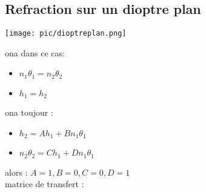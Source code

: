 \documentclass[12pt]{book}
\begin{document}
        \subsection{Refraction sur un dioptre plan}
            \begin{center}
                \texttt{[image: pic/dioptreplan.png]}
            \end{center}
            \begin{center}
                \begin{minipage}{0.49\linewidth}
                    ona dans ce cas:
                    \begin{itemize}
                        \item $n_1\theta_1 = n_2\theta_2$
                        \item $h_1 = h_2$
                    \end{itemize}
                    
                \end{minipage}
                \begin{minipage}{0.49\linewidth}
                    ona toujour :
                    \begin{itemize}
                        \item $ h_2 = Ah_1 + Bn_1\theta_1$
                        \item $ n_2\theta_2 = Ch_1 + Dn_1\theta_1$
                    \end{itemize}
                    
                \end{minipage}
            \end{center}
            alors : $ A = 1 , B = 0 ,C = 0 , D = 1$ \\ 
            matrice de transfert : 
            \begin{center}
            \end{center}
            
\end{document}
